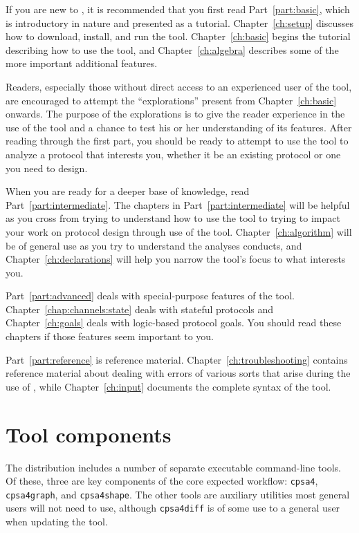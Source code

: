 If you are new to {\cpsa}, it is recommended that you first read
Part~\ref{part:basic}, which is introductory in nature and presented
as a tutorial.  Chapter~\ref{ch:setup} discusses how to download,
install, and run the tool.  Chapter~\ref{ch:basic} begins the tutorial
describing how to use the tool, and Chapter~\ref{ch:algebra} describes
some of the more important additional features.

Readers, especially those without direct access to an experienced user
of the tool, are encouraged to attempt the ``explorations'' present
from Chapter~\ref{ch:basic} onwards.  The purpose of the explorations
is to give the reader experience in the use of the tool and a chance
to test his or her understanding of its features.  After reading
through the first part, you should be ready to attempt to use the tool
to analyze a protocol that interests you, whether it be an existing
protocol or one you need to design.

When you are ready for a deeper base of knowledge, read
Part~\ref{part:intermediate}.  The chapters in
Part~\ref{part:intermediate} will be helpful as you cross from trying
to understand how to use the tool to trying to impact your work on
protocol design through use of the tool.  Chapter~\ref{ch:algorithm}
will be of general use as you try to understand the analyses {\cpsa}
conducts, and Chapter~\ref{ch:declarations} will help you narrow the
tool's focus to what interests you.

Part~\ref{part:advanced} deals with special-purpose features of the tool.
Chapter~\ref {chap:channels:state} deals with stateful protocols and
Chapter~\ref{ch:goals} deals with logic-based protocol goals.  You
should read these chapters if those features seem important to you.

Part~\ref{part:reference} is reference material.
Chapter~\ref{ch:troubleshooting} contains reference material about
dealing with errors of various sorts that arise during the use of
{\cpsa}, while Chapter~\ref{ch:input} documents the complete syntax of
the tool.

\section{Tool components}

The distribution includes a number of separate executable command-line
tools.  Of these, three are key components of the core expected
workflow: \texttt{cpsa4}, \texttt{cpsa4graph}, and \texttt{cpsa4shape}.
The other tools are auxiliary utilities most general users will not
need to use, although \texttt{cpsa4diff} is of some use to a general
user when updating the tool.

